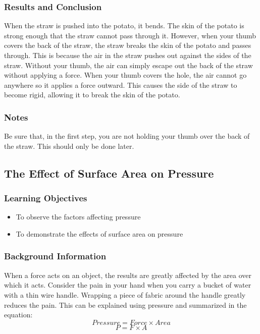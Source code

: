 \subsubsection*{Results and Conclusion}
When the straw is pushed into the potato, it bends. The skin of the potato is strong enough that the straw cannot pass through it. However, when your thumb covers the back of the straw, the straw breaks the skin of the potato and passes through. This is because the air in the straw pushes out against the sides of the straw. Without your thumb, the air can simply escape out the back of the straw without applying a force. When your thumb covers the hole, the air cannot go anywhere so it applies a force outward. This causes the side of the straw to become rigid, allowing it to break the skin of the potato.

\subsubsection*{Notes}
Be sure that, in the first step, you are not holding your thumb over the back of the straw. This should only be done later.

\subsection{The Effect of Surface Area on Pressure}

\subsubsection*{Learning Objectives}
\begin{itemize}
\item{To observe the factors affecting pressure} 
\item{To demonstrate the effects of surface area on pressure} 
\end{itemize}

\subsubsection*{Background Information}
When a force acts on an object, the results are greatly affected by the area over which it acts. Consider the pain in your hand when you carry a bucket of water with a thin wire handle. Wrapping a piece of fabric around the handle greatly reduces the pain. This can be explained using pressure and summarized in the equation:
$$Pressure=Force \times Area$$
$$P=F\times A$$

